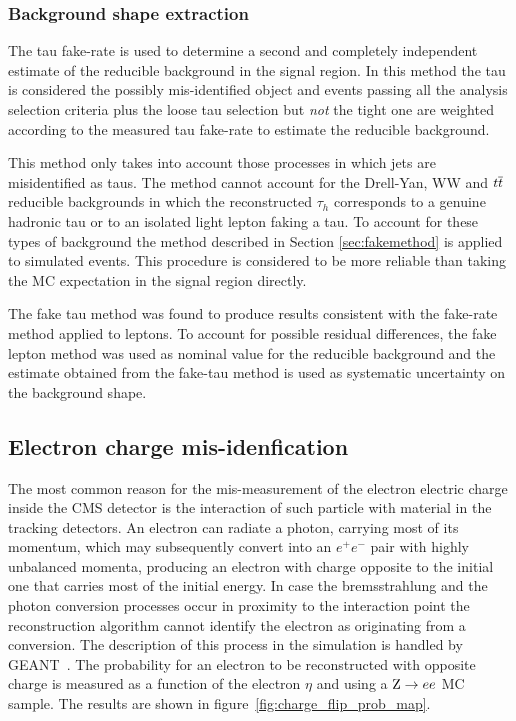 \subsubsection{Background shape extraction}

The tau fake-rate is used to determine a second and completely independent estimate of the reducible background in the signal region.
In this method the tau is considered the possibly mis-identified object and events passing all the analysis selection criteria plus the loose tau
selection but \emph{not} the tight one are weighted according to the measured tau fake-rate to estimate the reducible background.

This method only takes into account those processes in which jets are misidentified as taus. The method cannot account for the Drell-Yan, WW and $t\overline{t}$ reducible backgrounds
in which the reconstructed $\tau_h$ corresponds to a genuine hadronic tau or to an isolated light lepton faking a tau. To account for these types of background the method described in Section \ref{sec:fakemethod}
is applied to simulated events. This procedure is considered to be more reliable than taking the MC expectation in the signal region directly.

The fake tau method was found to produce results consistent with the fake-rate method applied to leptons. To account for possible residual differences,
the fake lepton method was used as nominal value for the reducible background and the estimate obtained from the fake-tau method is used as systematic uncertainty on the background shape.

\subsection{Electron charge mis-idenfication}
\label{sec:charge_misid}

The most common reason for the mis-measurement of the electron electric charge inside the CMS detector is the interaction of such particle with material in the tracking detectors. %
An electron can radiate a photon, carrying most of its momentum, which may subsequently convert into an $e^+e^-$ pair with highly unbalanced momenta, producing an electron with charge opposite to the initial one that carries most of the initial energy. %
In case the bremsstrahlung and the photon conversion processes occur 
in proximity to the interaction point the reconstruction algorithm cannot identify the electron as originating from a conversion.
The description of this process in the simulation is handled by \textsc{GEANT}~\cite{geant}. The probability for an electron to be reconstructed with opposite charge is measured as a function of the electron $\eta$ and \pT using a $\mathrm{Z} \rightarrow ee$ MC sample. The results are shown in figure~\ref{fig:charge_flip_prob_map}.

